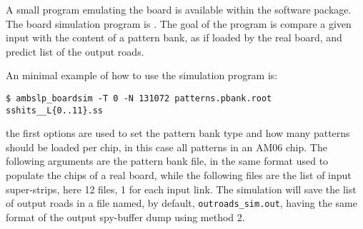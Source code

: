 \label{sec:boardsim}
A small program emulating the board is available within the software
package. The board simulation program is 
\textbf{\texttt{}}. The goal of the program 
is compare a given input with the content of a pattern bank, as if loaded
by the real board, and predict list of the output roads.

An minimal example of how to use the simulation program is:
\begin{verbatim}
$ ambslp_boardsim -T 0 -N 131072 patterns.pbank.root sshits__L{0..11}.ss
\end{verbatim}
the first options are used to set the pattern bank type and how many
patterns should be loaded per chip, in this case all patterns in an AM06 chip.
The following arguments are the pattern bank file, in the same format
used to populate the chips of a real board, while the following files are
the list of input super-strips, here 12 files, 1 for each input link.
The simulation will save the list of output roads in a file named, by default,
\texttt{outroads\_sim.out}, having the same format of the output 
spy-buffer dump using method 2.